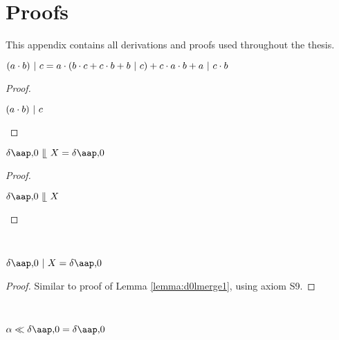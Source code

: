 \chapter{Proofs}
\label{apx:proofs}

This appendix contains all derivations and proofs used throughout the thesis.
\\
\begin{lemma} \label{lemma:abcommc}
$(a \cdot b) ~|~ c =  a \cdot (b \cdot c + c \cdot b + b ~|~ c) + c \cdot a \cdot b + a ~|~ c \cdot b$
\end{lemma}

\begin{proof}
\begin{derivation}{$(a \cdot b) ~|~ c$}
\end{derivation}
\end{proof}

\begin{lemma} \label{lemma:d0lmerge1}
$\delta \at 0 \lmerge X = \delta \at 0$
\end{lemma}
\begin{proof}

\begin{derivation}{$\delta \at 0 \lmerge X$}
\end{derivation}
\end{proof}
\\
\begin{lemma} \label{lemma:d0comm}
$\delta \at 0 \comm X = \delta \at 0$
\end{lemma}

\begin{proof}
Similar to proof of Lemma \ref{lemma:d0lmerge1}, using axiom S9.
\end{proof}
\\
\begin{lemma} \label{lemma:xbefored0}
$\alpha \before \delta \at 0 = \delta \at 0$
\end{lemma}

